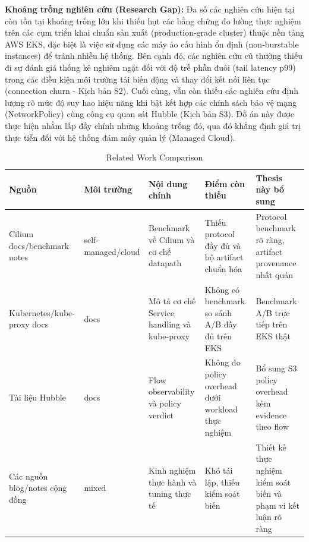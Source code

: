 \textbf{Khoảng trống nghiên cứu (Research Gap):} Đa số các nghiên cứu hiện tại còn tồn tại khoảng trống lớn khi thiếu hụt các bằng chứng đo lường thực nghiệm trên các cụm triển khai chuẩn sản xuất (production-grade cluster) thuộc nền tảng AWS EKS, đặc biệt là việc sử dụng các máy ảo cấu hình ổn định (non-burstable instances) để tránh nhiễu hệ thống. Bên cạnh đó, các nghiên cứu cũ thường thiếu đi sự đánh giá thống kê nghiêm ngặt đối với độ trễ phần đuôi (tail latency p99) trong các điều kiện môi trường tải biến động và thay đổi kết nối liên tục (connection churn - Kịch bản S2). Cuối cùng, vẫn còn thiếu các nghiên cứu định lượng rõ mức độ suy hao hiệu năng khi bật kết hợp các chính sách bảo vệ mạng (NetworkPolicy) cùng công cụ quan sát Hubble (Kịch bản S3). Đồ án này được thực hiện nhằm lấp đầy chính những khoảng trống đó, qua đó khẳng định giá trị thực tiễn đối với hệ thống đám mây quản lý (Managed Cloud).

\begin{table}[H]
\centering
\caption{Related Work Comparison}
\label{tab:related-work-comparison}
\renewcommand{\arraystretch}{1.3} 
\begin{tabularx}{\textwidth}{|>{\raggedright\arraybackslash}p{2.6cm}|>{\raggedright\arraybackslash}p{2.2cm}|>{\raggedright\arraybackslash}X|>{\raggedright\arraybackslash}p{2.8cm}|>{\raggedright\arraybackslash}p{3.2cm}|}
\hline
\textbf{Nguồn} & \textbf{Môi trường} & \textbf{Nội dung chính} & \textbf{Điểm còn thiếu} & \textbf{Thesis này bổ sung} \\
\hline
Cilium docs/\allowbreak benchmark notes & self-managed/\allowbreak cloud & Benchmark về Cilium và cơ chế datapath & Thiếu protocol đầy đủ và bộ artifact chuẩn hóa & Protocol benchmark rõ ràng, artifact provenance nhất quán \\
\hline
Kubernetes/\allowbreak kube-proxy docs & docs & Mô tả cơ chế Service handling và kube-proxy & Không có benchmark so sánh A/B đầy đủ trên EKS & Benchmark A/B trực tiếp trên EKS thật \\
\hline
Tài liệu Hubble & docs & Flow observability và policy verdict & Không đo policy overhead dưới workload thực nghiệm & Bổ sung S3 policy overhead kèm evidence theo flow \\
\hline
Các nguồn blog/\allowbreak notes cộng đồng & mixed & Kinh nghiệm thực hành và tuning thực tế & Khó tái lập, thiếu kiểm soát biến & Thiết kế thực nghiệm kiểm soát biến và phạm vi kết luận rõ ràng \\
\hline
\end{tabularx}
\end{table}

